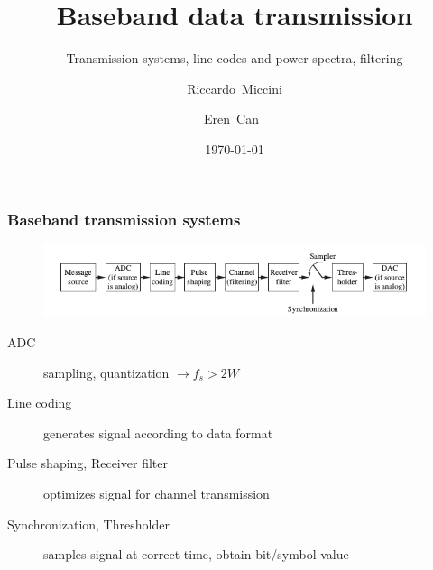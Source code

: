 \documentclass{beamer}
\title{Baseband data transmission}
\subtitle{Transmission systems, line codes and power spectra, filtering}
\author[Riccardo \and Eren]{Riccardo~Miccini\inst{1} \and Eren~Can~\inst{1}}
\institute[DTU]
{
	\inst{1}
	Technical University of Denmark\\
	Digital Communication
}
\date{\today}
\begin{document}
	\frame{\titlepage}

	\begin{frame}
		\frametitle{Baseband transmission systems}
		\begin{figure}
			\includegraphics[width=\textwidth,keepaspectratio,center]{block_dia.png}
		\end{figure}
		\begin{description}
			\item [ADC] sampling, quantization $ \rightarrow f_s > 2W$
			\item [Line coding] generates signal according to data format
			\item [Pulse shaping, Receiver filter] optimizes signal for channel transmission
			\item [Synchronization, Thresholder] samples signal at correct time, obtain bit/symbol value
		\end{description}
	\end{frame}
\end{document}
